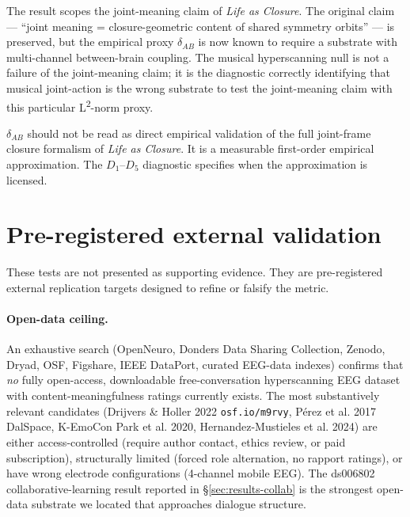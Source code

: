 \documentclass[11pt,a4paper]{article}
\begin{document}
The result scopes the joint-meaning claim of \emph{Life as Closure}. The original claim --- ``joint meaning = closure-geometric content of shared symmetry orbits'' --- is preserved, but the empirical proxy $\delta_{AB}$ is now known to require a substrate with multi-channel between-brain coupling. The musical hyperscanning null is not a failure of the joint-meaning claim; it is the diagnostic correctly identifying that musical joint-action is the wrong substrate to test the joint-meaning claim with this particular L\textsuperscript{2}-norm proxy.

$\delta_{AB}$ should not be read as direct empirical validation of the full joint-frame closure formalism of \emph{Life as Closure}. It is a measurable first-order empirical approximation. The $D_1$--$D_5$ diagnostic specifies when the approximation is licensed.

\section{Pre-registered external validation}\label{sec:external}

These tests are not presented as supporting evidence. They are pre-registered external replication targets designed to refine or falsify the metric.

\paragraph{Open-data ceiling.} An exhaustive search (OpenNeuro, Donders Data Sharing Collection, Zenodo, Dryad, OSF, Figshare, IEEE DataPort, curated EEG-data indexes) confirms that \emph{no} fully open-access, downloadable free-conversation hyperscanning EEG dataset with content-meaningfulness ratings currently exists. The most substantively relevant candidates (Drijvers \& Holler 2022 \texttt{osf.io/m9rvy}, P\'erez et al. 2017 DalSpace, K-EmoCon Park et al. 2020, Hernandez-Mustieles et al. 2024) are either access-controlled (require author contact, ethics review, or paid subscription), structurally limited (forced role alternation, no rapport ratings), or have wrong electrode configurations (4-channel mobile EEG). The ds006802 collaborative-learning result reported in §\ref{sec:results-collab} is the strongest open-data substrate we located that approaches dialogue structure.
\end{document}

